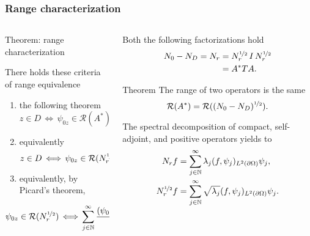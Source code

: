 \documentclass[10pt,xcolor={dvipsnames}]{beamer}
\theoremstyle{plain}
\theoremstyle{plain}
\begin{document}
\begin{frame}
 \frametitle{Range characterization}
\begin{columns}[T]
\begin{column}{0.5\textwidth}
\begin{block}{Theorem: range characterization}
 {\footnotesize
 There holds these criteria of range equivalence
 \begin{enumerate}
  \item the following theorem
  {\normalsize
 \begin{equation}
   z \in D \,\Longleftrightarrow \,\psi_{0z} \in \mathcal{R}(A^*).
 \end{equation}}
 \item equivalently
  {\normalsize
 \begin{equation}
  z \in D \,\Longleftrightarrow \,\psi_{0z} \in \mathcal{R}(N_r^{\nicefrac{1}{2}}).
 \end{equation}}
 \item equivalently, by Picard's theorem,
\end{enumerate}
\small{
\begin{equation}
   \psi_{0z} \in \mathcal{R}(N_r^{\nicefrac{1}{2}})
   \,\Longleftrightarrow \,
   \sum_{j\in \mathbb{N}}^\infty \frac{(\psi_{0z},\psi_j)^2}{\lambda_j}<\infty. 
\end{equation}
}
}
\end{block}
\end{column}
\begin{column}{0.47\textwidth}
{\footnotesize
Both the following factorizations hold}
\begin{align}
\label{eq:factorization-two}
 {N_0} - {N_D}=N_r&=N_r^{\nicefrac{1}{2}}\,I\,N_r^{\nicefrac{1}{2}}\\
 &= A^*TA.
\end{align}
\vspace{-1cm}
 \begin{block}
 {\small Theorem}
 {\footnotesize
 The range of two operators is the same}
 \begin{equation}
  \mathcal{R}(A^*) = \mathcal{R}(({N_0} - {N_D})^{\nicefrac{1}{2}}).
 \end{equation}
 \end{block}
{\footnotesize
The spectral decomposition of compact, self-adjoint, and positive operators yields to}
{\small
\begin{align}
N_r f &= \sum_{j\in \mathbb{N}}^\infty \lambda_j(f,\psi_j)_{L^2(\partial\Omega)} \psi_j ,\\
N_r^{\nicefrac{1}{2}} f &= \sum_{j\in \mathbb{N}}^\infty \sqrt{\lambda_j}(f,\psi_j)_{L^2(\partial\Omega)} \psi_j.
\end{align}}

\end{column}
\end{columns}
\end{frame}
\end{document}
